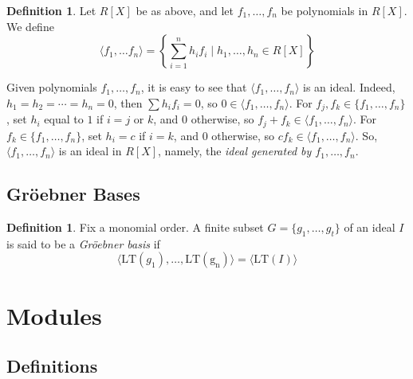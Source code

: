 \documentclass{amsart}
\theoremstyle{definition}
\newtheorem{definition}[theorem]{Definition}
\theoremstyle{remark}
\numberwithin{equation}{section}
\begin{document}
\begin{definition}
  Let $R[X]$ be as above, and let $f_1, \ldots, f_n$ be polynomials in $R[X]$. We define
  \begin{equation*}
    \langle f_1, \ldots f_n \rangle = \left\{ \sum_{i = 1}^n h_i f_i \mid h_1, \ldots, h_n \in R[X] \right\}
  \end{equation*}
\end{definition}

Given polynomials $f_1, \ldots, f_n$, it is easy to see that $\langle f_1, \ldots, f_n \rangle$ is an ideal. Indeed, $h_1 = h_2 = \cdots = h_n = 0$, then $\sum h_i f_i = 0$, so $0 \in \langle f_1, \ldots, f_n \rangle$. For $f_j, f_k \in \{ f_1, \ldots, f_n \}$, set $h_i$ equal to $1$ if $i = j$ or $k$, and $0$ otherwise, so $f_j + f_k \in \langle f_1, \ldots, f_n \rangle$. For $f_k \in \{ f_1, \ldots, f_n \}$, set $h_i = c$ if $i = k$, and $0$ otherwise, so $c f_k \in \langle f_1, \ldots, f_n \rangle$. So, $\langle f_1, \ldots, f_n \rangle$ is an ideal in $R[X]$, namely, the \emph{ideal generated by $f_1, \ldots, f_n$}.

\leavevmode


\leavevmode


\subsection{Gr\"oebner Bases}

\begin{definition}
  Fix a monomial order. A finite subset $G = \{ g_1, \ldots, g_t \}$ of an ideal $I$ is said to be a \emph{Gr\"oebner basis} if
  \begin{equation*}
    \langle \mathrm{LT}(g_1), \ldots, \mathrm{LT(g_n)} \rangle = \langle \mathrm{LT}(I) \rangle
  \end{equation*}
\end{definition}


\section{Modules}
\label{sec:modules}

\subsection{Definitions}
\end{document}
